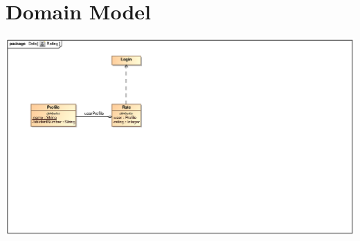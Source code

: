 \documentclass{scrreprt}
\begin{document}
\section{Domain Model} 
\includegraphics[scale=.9]{graphics/rateUML.eps}\\	
\end{document}
